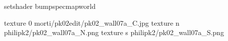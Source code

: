 setshader bumpspecmapworld

texture 0 morti/pk02edit/pk02_wall07a_C.jpg
texture n philipk2/pk02_wall07a_N.png
texture s philipk2/pk02_wall07a_S.png

